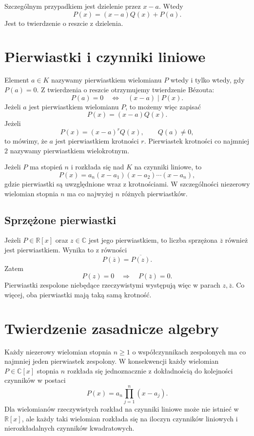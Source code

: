 \documentclass{article}
\begin{document}
Szczególnym przypadkiem jest dzielenie przez $x-a$. Wtedy
\[
    P(x)=(x-a)Q(x)+P(a).
\]
Jest to twierdzenie o reszcie z dzielenia.

\section{Pierwiastki i czynniki liniowe}
Element $a\in K$ nazywamy pierwiastkiem wielomianu $P$ wtedy i tylko wtedy,
gdy $P(a)=0$. Z twierdzenia o reszcie otrzymujemy twierdzenie Bézouta:
\[
    P(a)=0\quad\Longleftrightarrow\quad (x-a)\mid P(x).
\]
Jeżeli $a$ jest pierwiastkiem wielomianu $P$, to możemy więc zapisać
\[
    P(x)=(x-a)Q(x).
\]
Jeżeli
\[
    P(x)=(x-a)^rQ(x),\qquad Q(a)\neq 0,
\]
to mówimy, że $a$ jest pierwiastkiem krotności $r$. Pierwiastek krotności
co najmniej $2$ nazywamy pierwiastkiem wielokrotnym.

Jeżeli $P$ ma stopień $n$ i rozkłada się nad $K$ na czynniki liniowe, to
\[
    P(x)=a_n(x-a_1)(x-a_2)\cdots(x-a_n),
\]
gdzie pierwiastki są uwzględnione wraz z krotnościami. W szczególności
niezerowy wielomian stopnia $n$ ma co najwyżej $n$ różnych pierwiastków.

\subsection{Sprzężone pierwiastki}
Jeżeli $P\in\mathbb{R}[x]$ oraz $z\in\mathbb{C}$ jest jego pierwiastkiem,
to liczba sprzężona $\overline{z}$ również jest pierwiastkiem. Wynika to z
równości
\[
    P(\overline{z})=\overline{P(z)}.
\]
Zatem
\[
    P(z)=0\quad\Longrightarrow\quad P(\overline{z})=0.
\]
Pierwiastki zespolone niebędące rzeczywistymi występują więc w parach
$z,\overline{z}$. Co więcej, oba pierwiastki mają taką samą krotność.

\section{Twierdzenie zasadnicze algebry}
Każdy niezerowy wielomian stopnia $n\geq 1$ o współczynnikach zespolonych ma
co najmniej jeden pierwiastek zespolony. W konsekwencji każdy wielomian
$P\in\mathbb{C}[x]$ stopnia $n$ rozkłada się jednoznacznie z dokładnością do
kolejności czynników w postaci
\[
    P(x)=a_n\prod_{j=1}^{n}(x-a_j).
\]
Dla wielomianów rzeczywistych rozkład na czynniki liniowe może nie istnieć
w $\mathbb{R}[x]$, ale każdy taki wielomian rozkłada się na iloczyn
czynników liniowych i nierozkładalnych czynników kwadratowych.
\end{document}
